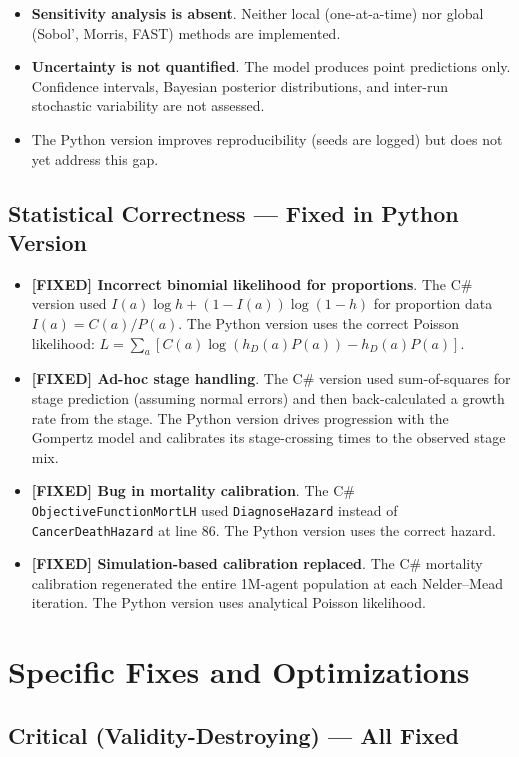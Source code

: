 \documentclass[12pt,a4paper]{article}
\begin{document}
\begin{itemize}[nosep]
    \item \textbf{Sensitivity analysis is absent}. Neither local (one-at-a-time) nor global (Sobol', Morris, FAST) methods are implemented.
    \item \textbf{Uncertainty is not quantified}. The model produces point predictions only. Confidence intervals, Bayesian posterior distributions, and inter-run stochastic variability are not assessed.
    \item The Python version improves reproducibility (seeds are logged) but does not yet address this gap.
\end{itemize}

\subsection{Statistical Correctness --- Fixed in Python Version}

\begin{itemize}[nosep]
    \item \textbf{[FIXED] Incorrect binomial likelihood for proportions}. The C\# version used $I(a) \log h + (1-I(a))\log(1-h)$ for proportion data $I(a) = C(a)/P(a)$. The Python version uses the correct Poisson likelihood: $L = \sum_a [C(a) \log(h_D(a) P(a)) - h_D(a) P(a)]$.
    \item \textbf{[FIXED] Ad-hoc stage handling}. The C\# version used sum-of-squares for stage prediction (assuming normal errors) and then back-calculated a growth rate from the stage. The Python version drives progression with the Gompertz model and calibrates its stage-crossing times to the observed stage mix.
    \item \textbf{[FIXED] Bug in mortality calibration}. The C\# \texttt{ObjectiveFunctionMortLH} used \texttt{DiagnoseHazard} instead of \texttt{CancerDeathHazard} at line 86. The Python version uses the correct hazard.
    \item \textbf{[FIXED] Simulation-based calibration replaced}. The C\# mortality calibration regenerated the entire 1M-agent population at each Nelder--Mead iteration. The Python version uses analytical Poisson likelihood.
\end{itemize}

\section{Specific Fixes and Optimizations}

\subsection{Critical (Validity-Destroying) --- All Fixed}
\end{document}
